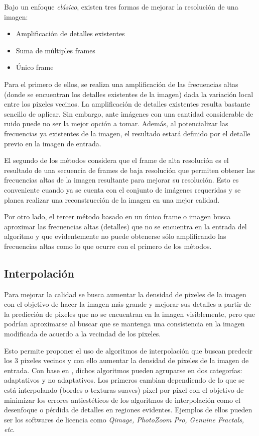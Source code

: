 \noindent
Bajo un enfoque \emph{clásico}, existen tres formas de mejorar la resolución 
de una imagen:

\begin{itemize}
    \item Amplificación de detalles existentes
    \item Suma de múltiples frames
    \item Único frame
\end{itemize}

Para el primero de ellos, se realiza una amplificación de las frecuencias altas
(donde se encuentran los detalles existentes de la imagen) dada la variación local
entre los pixeles vecinos. 
La amplificación de detalles existentes resulta bastante 
sencillo de aplicar. Sin embargo, ante imágenes con una cantidad considerable de
ruido puede no ser la mejor opción a tomar. Además, al potencializar las 
frecuencias ya existentes de la imagen, el resultado estará definido por el detalle
previo en la imagen de entrada. 

El segundo de los métodos considera que el frame de alta resolución es el resultado
de una secuencia de frames de baja resolución que permiten obtener las frecuencias 
altas de la imagen resultante para mejorar su resolución. Esto es conveniente cuando
ya se cuenta con el conjunto de imágenes requeridas y se planea realizar una 
reconstrucción de la imagen en una mejor calidad.

Por otro lado, el tercer método basado en un único frame o imagen busca aproximar las
frecuencias altas (detalles) que no se encuentra en la entrada del algoritmo y que evidentemente
no puede obtenerse sólo amplificando las frecuencias altas como lo que ocurre con 
el primero de los métodos. 

\subsection{Interpolación}
\noindent
Para mejorar la calidad se busca aumentar la densidad de pixeles de la imagen con el objetivo
de hacer la imagen más grande y mejorar sus detalles a partir de la predicción de 
pixeles que no se encuentran en la imagen visiblemente, pero que podrían aproximarse
al buscar que se mantenga una consistencia en la imagen modificada de acuerdo a la
vecindad de los pixeles. 

Esto permite proponer el uso de algoritmos de interpolación que buscan predecir los  3
pixeles vecinos y con ello aumentar la densidad de pixeles de la imagen de entrada. 
Con base en \cite{interpolation_cambridge}, dichos algoritmos pueden agruparse en dos
categorías: adaptativos y no adaptativos. Los primeros cambian dependiendo de lo que
se está interpolando (bordes o texturas suaves) pixel por pixel con el objetivo de
minimizar los errores antiestéticos de los algoritmos de interpolación como el
desenfoque o pérdida de detalles en regiones evidentes. Ejemplos de ellos pueden
ser los softwares de licencia como \emph{Qimage, PhotoZoom Pro, Genuine Fractals, etc}. 

